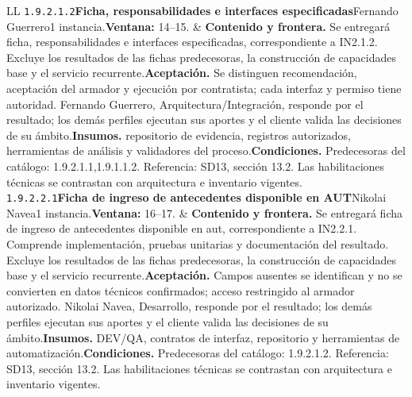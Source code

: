 \begin{longtable}{L{\tabcolsep\relax}L{\tabcolsep\relax}}
\texttt{1.\allowbreak{}9.\allowbreak{}2.\allowbreak{}1.\allowbreak{}2}\newline{}\textbf{Ficha, responsabilidades e interfaces especificadas}\newline{}Fernando Guerrero\newline{}1 instancia.\newline{}\textbf{Ventana:} 14--15. & \textbf{Contenido y frontera.} Se entregará ficha, responsabilidades e interfaces especificadas, correspondiente a IN2.1.2. Excluye los resultados de las fichas predecesoras, la construcción de capacidades base y el servicio recurrente.\newline{}\textbf{Aceptación.} Se distinguen recomendación, aceptación del armador y ejecución por contratista; cada interfaz y permiso tiene autoridad. Fernando Guerrero, Arquitectura/Integración, responde por el resultado; los demás perfiles ejecutan sus aportes y el cliente valida las decisiones de su ámbito.\newline{}\textbf{Insumos.} repositorio de evidencia, registros autorizados, herramientas de análisis y validadores del proceso.\newline{}\textbf{Condiciones.} Predecesoras del catálogo: 1.9.2.1.1,1.9.1.1.2. Referencia: SD13, sección 13.2. Las habilitaciones técnicas se contrastan con arquitectura e inventario vigentes.\\\hline
\texttt{1.\allowbreak{}9.\allowbreak{}2.\allowbreak{}2.\allowbreak{}1}\newline{}\textbf{Ficha de ingreso de antecedentes disponible en AUT}\newline{}Nikolai Navea\newline{}1 instancia.\newline{}\textbf{Ventana:} 16--17. & \textbf{Contenido y frontera.} Se entregará ficha de ingreso de antecedentes disponible en aut, correspondiente a IN2.2.1. Comprende implementación, pruebas unitarias y documentación del resultado. Excluye los resultados de las fichas predecesoras, la construcción de capacidades base y el servicio recurrente.\newline{}\textbf{Aceptación.} Campos ausentes se identifican y no se convierten en datos técnicos confirmados; acceso restringido al armador autorizado. Nikolai Navea, Desarrollo, responde por el resultado; los demás perfiles ejecutan sus aportes y el cliente valida las decisiones de su ámbito.\newline{}\textbf{Insumos.} DEV/QA, contratos de interfaz, repositorio y herramientas de automatización.\newline{}\textbf{Condiciones.} Predecesoras del catálogo: 1.9.2.1.2. Referencia: SD13, sección 13.2. Las habilitaciones técnicas se contrastan con arquitectura e inventario vigentes.\\\hline

\end{longtable}
